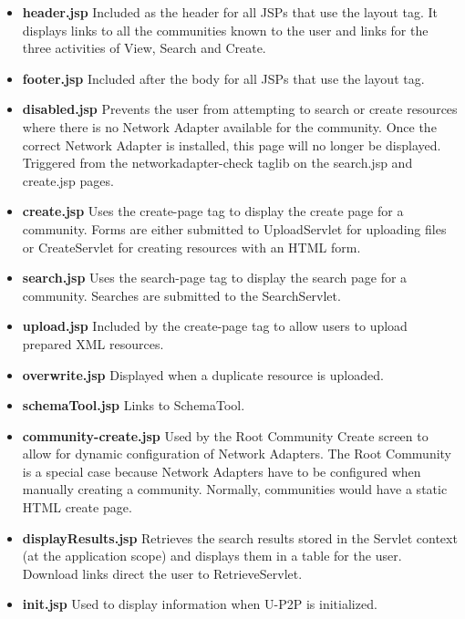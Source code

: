 \documentclass[titlepage]{article}%
\begin{document}
\begin{itemize}
\item \textbf{header.jsp} Included as the header for all JSPs that use the layout tag. It displays links to all the communities known to the user and links for the three activities of View, Search and Create.

\item \textbf{footer.jsp } Included after the body for all JSPs that use the layout tag.

\item \textbf{disabled.jsp } Prevents the user from attempting to search or create resources where there is no Network Adapter available for the community. Once the correct Network Adapter is installed, this page will no longer be displayed. Triggered from the networkadapter-check taglib on the search.jsp and create.jsp pages.

\item \textbf{create.jsp } Uses the create-page tag to display the create page for a community. Forms are either submitted to UploadServlet for uploading files or CreateServlet for creating resources with an HTML form.

\item \textbf{search.jsp } Uses the search-page tag to display the search page for a community. Searches are submitted to the SearchServlet.

\item \textbf{upload.jsp } Included by the create-page tag to allow users to upload prepared XML resources.

\item \textbf{overwrite.jsp } Displayed when a duplicate resource is uploaded.

\item \textbf{schemaTool.jsp } Links to SchemaTool.

\item \textbf{community-create.jsp } Used by the Root Community Create screen to allow for dynamic configuration of Network Adapters. The Root Community is a special case because Network Adapters have to be configured when manually creating a community. Normally, communities would have a static HTML create page.

\item \textbf{displayResults.jsp } Retrieves the search results stored in the Servlet context (at the application scope) and displays them in a table for the user. Download links direct the user to RetrieveServlet.

\item \textbf{init.jsp } Used to display information when U-P2P is initialized.

\end{itemize}
\end{document}
